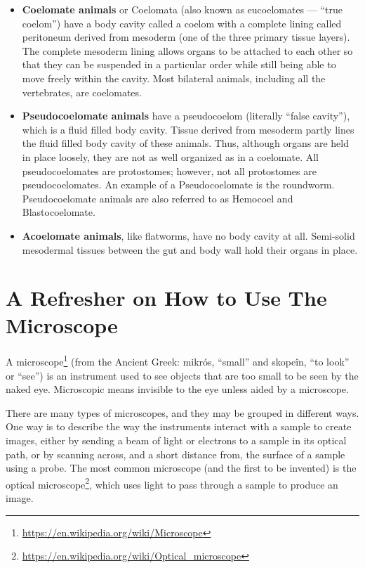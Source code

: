 \documentclass[]{book}
\let\rmarkdownfootnote\footnote%
\def\footnote{\protect\rmarkdownfootnote}
\renewcommand{\href}[2]{#2\footnote{\url{#1}}}
\theoremstyle{definition}
\theoremstyle{definition}
\theoremstyle{definition}
\theoremstyle{remark}
\begin{document}
\begin{itemize}
\item
  \textbf{Coelomate animals} or Coelomata (also known as eucoelomates
  --- ``true coelom'') have a body cavity called a coelom with a
  complete lining called peritoneum derived from mesoderm (one of the
  three primary tissue layers). The complete mesoderm lining allows
  organs to be attached to each other so that they can be suspended in a
  particular order while still being able to move freely within the
  cavity. Most bilateral animals, including all the vertebrates, are
  coelomates.
\item
  \textbf{Pseudocoelomate animals} have a pseudocoelom (literally
  ``false cavity''), which is a fluid filled body cavity. Tissue derived
  from mesoderm partly lines the fluid filled body cavity of these
  animals. Thus, although organs are held in place loosely, they are not
  as well organized as in a coelomate. All pseudocoelomates are
  protostomes; however, not all protostomes are pseudocoelomates. An
  example of a Pseudocoelomate is the roundworm. Pseudocoelomate animals
  are also referred to as Hemocoel and Blastocoelomate.
\item
  \textbf{Acoelomate animals}, like flatworms, have no body cavity at
  all. Semi-solid mesodermal tissues between the gut and body wall hold
  their organs in place.
\end{itemize}

\chapter{A Refresher on How to Use The
Microscope}\label{a-refresher-on-how-to-use-the-microscope}

A \href{https://en.wikipedia.org/wiki/Microscope}{microscope} (from the
Ancient Greek: mikrós, ``small'' and skopeîn, ``to look'' or ``see'') is
an instrument used to see objects that are too small to be seen by the
naked eye. Microscopic means invisible to the eye unless aided by a
microscope.

There are many types of microscopes, and they may be grouped in
different ways. One way is to describe the way the instruments interact
with a sample to create images, either by sending a beam of light or
electrons to a sample in its optical path, or by scanning across, and a
short distance from, the surface of a sample using a probe. The most
common microscope (and the first to be invented) is the
\href{https://en.wikipedia.org/wiki/Optical_microscope}{optical
microscope}, which uses light to pass through a sample to produce an
image.
\end{document}
